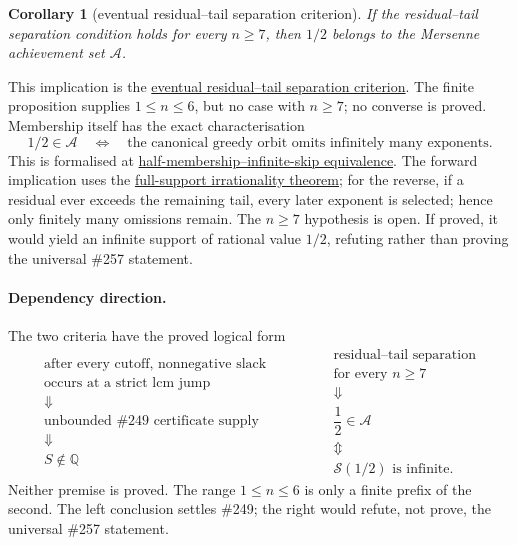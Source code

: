 \documentclass[11pt]{article}
\newcommand{\commit}{bb4e24651b37cd096d3749ef299c3317930b3a3b}
\newcommand{\repobase}{https://github.com/wcook04/plectis-lean-erdos249-257/blob/\commit}
\newcommand{\PK}{Erdos249257}
\newcommand{\lword}[4]{\href{\repobase/\PK/#1\#L#2}{#4}}
\newtheorem{corollary}[theorem]{Corollary}
\theoremstyle{definition}
\theoremstyle{remark}
\newcommand{\Q}{\mathbb{Q}}
\begin{document}
\begin{corollary}[eventual residual--tail separation criterion]
\label{res:secondcriterion}
If the residual--tail separation condition holds for every \(n\ge7\), then
\(1/2\) belongs to the Mersenne achievement set \(\mathcal A\).
\end{corollary}
\noindent This implication is the
\lword{GreedyAchievementSet.lean}{3151}{half_mem_mersenneAchievementSet_of_secondChannelSeparationRat_from_seven}{eventual residual--tail separation criterion}.
The finite proposition supplies \(1\le n\le6\), but no case with \(n\ge7\);
no converse is proved.  Membership itself has the exact characterisation
\[
  1/2\in\mathcal A
  \quad\Longleftrightarrow\quad
  \text{the canonical greedy orbit omits infinitely many exponents}.
\]
This is formalised at
\lword{GreedyAchievementSet.lean}{2583}{half_mem_mersenneAchievementSet_iff_greedySkippedSupport_infinite}{half-membership--infinite-skip equivalence}.
The forward implication uses the
\hyperref[res:full]{full-support irrationality theorem}; for the reverse,
if a residual ever exceeds the remaining tail, every later exponent is
selected; hence only finitely many omissions remain.  The \(n\ge7\) hypothesis
is open.  If proved, it would yield an infinite support of rational value
\(1/2\), refuting rather than proving the universal \#257 statement.

\paragraph{Dependency direction.}
The two criteria have the proved logical form
\[
\begin{array}{c}
 \text{after every cutoff, nonnegative slack}\\[-1pt]
 \text{occurs at a strict lcm jump}\\
 \Downarrow\\
 \text{unbounded \#249 certificate supply}\\
 \Downarrow\\
 S\notin\Q
\end{array}
\qquad\qquad
\begin{array}{c}
 \text{residual--tail separation}\\[-1pt]
 \text{for every }n\ge7\\
 \Downarrow\\
 \dfrac12\in\mathcal A\\
 \Updownarrow\\
 \mathcal S(1/2)\text{ is infinite}.
\end{array}
\]
Neither premise is proved.  The range \(1\le n\le6\) is only a finite prefix
of the second.  The left conclusion settles \#249; the right would refute,
not prove, the universal \#257 statement.
\end{document}
